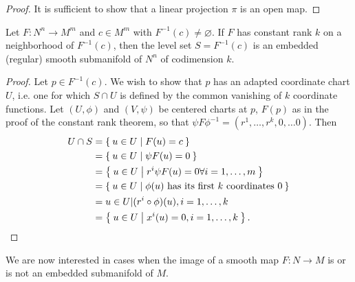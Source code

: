 \begin{proof}
It is sufficient to show that a linear projection $\pi$ is an open map.
\end{proof}

\begin{theorem}
Let $F: N^n \to M^m$ and $c \in M^m$ with $F^{-1}(c) \neq
\varnothing$. If $F$ has constant rank $k$ on a neighborhood of
$F^{-1}(c)$, then the level set $S = F^{-1}(c)$ is an embedded
(regular) smooth submanifold of $N^n$ of codimension $k$.
\end{theorem}

\begin{proof}
Let $p \in F^{-1}(c)$. We wish to show that $p$ has an adapted
coordinate chart $U$, i.e. one for which $S \cap U$ is defined by the
common vanishing of $k$ coordinate functions. Let $(U, \phi)$ and
$(V, \psi)$ be centered charts at $p$, $F(p)$ as in the proof of the
constant rank theorem, so that
$\psi F \phi^{-1} = (r^1, \dots, r^k, 0, \dots 0)$. Then
\begin{align*}
   U \cap S
&= \Set{ u \in U | F(u) = c } \\
&= \Set{ u \in U | \psi F(u) = 0 } \\
&= \Set{ u \in U | r^i \psi F(u) = 0 \forall i = 1, \dots, m } \\
&= \Set{ u \in U | \phi(u) \text{ has its first $k$ coordinates 0}} \\
&= { u \in U | (r^i \circ \phi)(u), i=1, \dots, k } \\
&= \Set{ u \in U | x^i(u) = 0, i=1, \dots, k }.
\end{align*}
\end{proof}

We are now interested in cases when the image of a smooth map $F: N
\to M$ is or is not an embedded submanifold of $M$.

